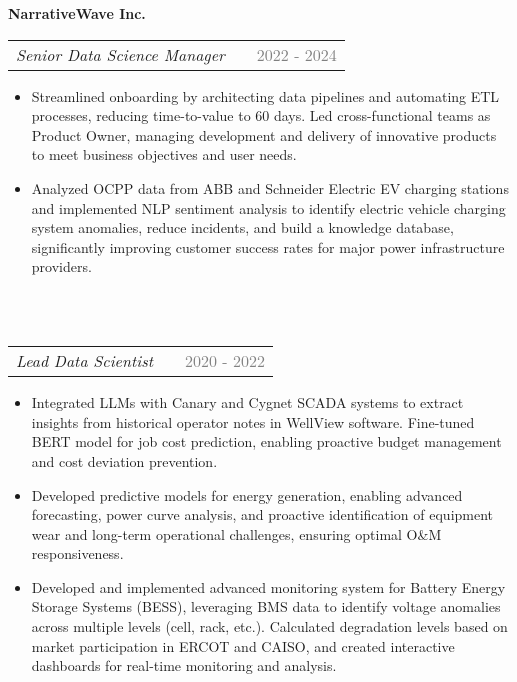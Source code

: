 \documentclass[a4paper,12pt]{article}
\makeatletter
\newenvironment{joblong}[3]
    {
    \noindent\textbf{\large #1}\\ %
    \begin{tabularx}{\linewidth}{@{}l X r@{}}
    \textit{#2} & &  {\textcolor{gray}{#3}} \\[3.75pt] %
    \end{tabularx}
    \begin{minipage}[t]{\linewidth}
    \begin{itemize}[nosep,after=\strut, leftmargin=1em, itemsep=3pt,label=--]
    }
    {
    \end{itemize}
    \end{minipage}    
    }
\makeatother
\begin{document}
\begin{joblong}{NarrativeWave Inc.}{Senior Data Science Manager}{2022 - 2024}
    \item Streamlined onboarding by architecting data pipelines and automating ETL processes, reducing time-to-value to 60 days. Led cross-functional teams as Product Owner, managing development and delivery of innovative products to meet business objectives and user needs.
    \item Analyzed OCPP data from ABB and Schneider Electric EV charging stations and implemented NLP sentiment analysis to identify electric vehicle charging system anomalies, reduce incidents, and build a knowledge database, significantly improving customer success rates for major power infrastructure providers.
\end{joblong}
\\
\begin{joblong}{}{Lead Data Scientist}{2020 - 2022}
    \item Integrated LLMs with Canary and Cygnet SCADA systems to extract insights from historical operator notes in WellView software. Fine-tuned BERT model for job cost prediction, enabling proactive budget management and cost deviation prevention.
    \item Developed predictive models for energy generation, enabling advanced forecasting, power curve analysis, and proactive identification of equipment wear and long-term operational challenges, ensuring optimal O\&M responsiveness. 
    \item Developed and implemented advanced monitoring system for Battery Energy Storage Systems (BESS), leveraging BMS data to identify voltage anomalies across multiple levels (cell, rack, etc.). Calculated degradation levels based on market participation in ERCOT and CAISO, and created interactive dashboards for real-time monitoring and analysis.
\end{joblong}
\\
\end{document}
